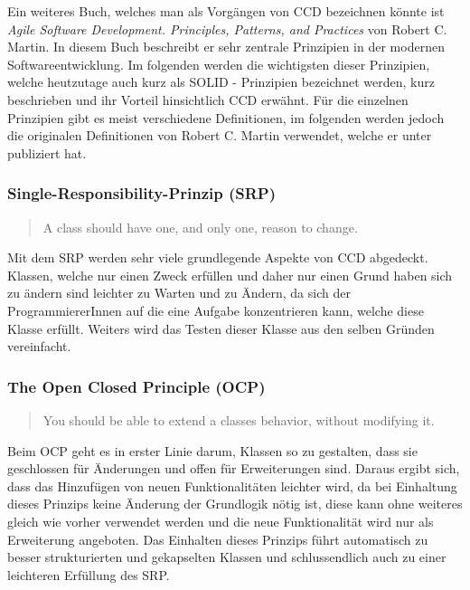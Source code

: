 \SuperPar Ein weiteres Buch, welches man als Vorgängen von CCD bezeichnen könnte ist \textit{Agile Software Development. Principles, Patterns, and Practices} \cite{Martin2002} von Robert C. Martin. In diesem Buch beschreibt er sehr zentrale Prinzipien in der modernen Softwareentwicklung. Im folgenden werden die wichtigsten dieser Prinzipien, welche heutzutage auch kurz als SOLID - Prinzipien bezeichnet werden, kurz beschrieben und ihr Vorteil hinsichtlich CCD erwähnt. Für die einzelnen Prinzipien gibt es meist verschiedene Definitionen, im folgenden werden jedoch die originalen Definitionen von Robert C. Martin verwendet, welche er unter \cite{Martin2016} publiziert hat. 

\subsubsection{Single-Responsibility-Prinzip (SRP)}
\begin{quotation}
	A class should have one, and only one, reason to change.
\end{quotation}

Mit dem SRP werden sehr viele grundlegende Aspekte von CCD abgedeckt. Klassen, welche nur einen Zweck erfüllen und daher nur einen Grund haben sich zu ändern sind leichter zu Warten und zu Ändern, da sich der ProgrammiererInnen auf die eine Aufgabe konzentrieren kann, welche diese Klasse erfüllt. Weiters wird das Testen dieser Klasse aus den selben Gründen vereinfacht. 

\subsubsection{The Open Closed Principle (OCP)}
\begin{quotation}
	You should be able to extend a classes behavior, without modifying it.
\end{quotation}

Beim OCP geht es in erster Linie darum, Klassen so zu gestalten, dass sie geschlossen für Änderungen und offen für Erweiterungen sind. 
Daraus ergibt sich, dass das Hinzufügen von neuen Funktionalitäten leichter wird, da bei Einhaltung dieses Prinzips keine Änderung der Grundlogik nötig ist, diese kann ohne weiteres gleich wie vorher verwendet werden und die neue Funktionalität wird nur als Erweiterung angeboten. Das Einhalten dieses Prinzips führt automatisch zu besser strukturierten und gekapselten Klassen und schlussendlich auch zu einer leichteren Erfüllung des SRP.


